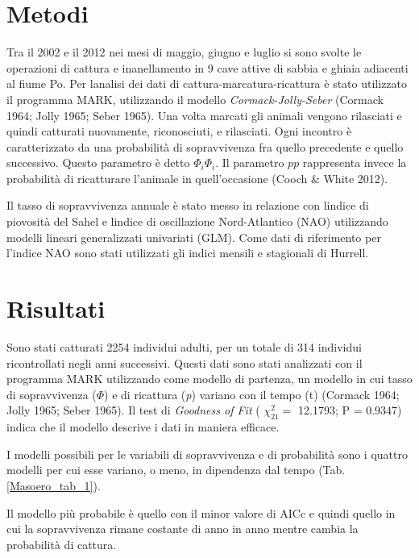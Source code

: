\section*{Metodi}

Tra il 2002 e il 2012 nei mesi di maggio, giugno e luglio si sono svolte
le operazioni di cattura e inanellamento in 9 cave attive di sabbia e
ghiaia adiacenti al fiume Po. Per l{\textquotesingle}analisi dei dati
di cattura-marcatura-ricattura \`e stato utilizzato il programma MARK,
utilizzando il modello \textit{Cormack-Jolly-Seber} (Cormack 1964;
Jolly 1965; Seber 1965). Una volta marcati gli animali vengono
rilasciati e quindi catturati nuovamente, riconosciuti, e rilasciati.
Ogni incontro \`e caratterizzato da una probabilit\`a di sopravvivenza
fra quello precedente e quello successivo. Questo parametro \`e detto  
$\Phi_{i}\Phi_{i}$. Il parametro $pp$ rappresenta invece la probabilit\`a di ricatturare
l{\textquoteright}animale in quell{\textquoteright}occasione (Cooch \&
White 2012).

Il tasso di sopravvivenza annuale \`e stato messo in relazione con
l{\textquotesingle}indice di piovosit\`a del Sahel e
l{\textquotesingle}indice di oscillazione Nord-Atlantico (NAO)
utilizzando modelli lineari generalizzati univariati (GLM). Come dati
di riferimento per l{\textquoteright}indice NAO sono stati utilizzati
gli indici mensili e stagionali di Hurrell.

\section*{Risultati}

Sono stati catturati 2254 individui adulti, per un totale di 314
individui ricontrollati negli anni successivi. Questi dati sono stati
analizzati con il programma MARK utilizzando come modello di partenza,
un modello in cui tasso di sopravvivenza (\textit{$\Phi $}) e di
ricattura (\textit{p}) variano con il tempo (t) (Cormack 1964; Jolly
1965; Seber 1965). Il test di \textit{Goodness of Fit} (  $\chi_{21}^{2}=$
  12.1793; P = 0.9347) indica che il modello descrive i dati in maniera
efficace. 

I modelli possibili per le variabili di sopravvivenza e di probabilit\`a
sono i quattro modelli per cui esse variano, o meno, in dipendenza dal
tempo (Tab. \ref{Masoero_tab_1}).

Il modello pi\`u probabile \`e quello con il minor valore di AICc e
quindi quello in cui la sopravvivenza rimane costante di anno in anno
mentre cambia la probabilit\`a di cattura. 

